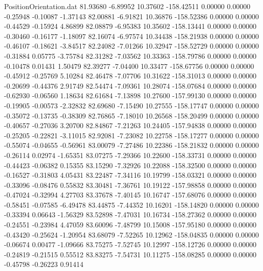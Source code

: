 \begin{filecontents}{PositionOrientation.dat}
  81.93680   -6.89952   10.37602  -158.42511    0.00000    0.00000   -0.25948   -0.10087   -1.37143
  82.00881   -6.91821   10.36876  -158.52386    0.00000    0.00000   -0.44529   -0.15924    4.86899
  82.08879   -6.95383   10.35602  -158.13441    0.00000    0.00000   -0.30460   -0.16177   -1.18097
  82.16074   -6.97574   10.34438  -158.21938    0.00000    0.00000   -0.46107   -0.18621   -3.84517
  82.24082   -7.01266   10.32947  -158.52729    0.00000    0.00000   -0.31884    0.05775   -3.75784
  82.31282   -7.03562   10.33363  -158.79786    0.00000    0.00000   -0.10478    0.01431    1.50479
  82.39277   -7.04400   10.33477  -158.67756    0.00000    0.00000   -0.45912   -0.25769    5.10284
  82.46478   -7.07706   10.31622  -158.31013    0.00000    0.00000   -0.20699   -0.44376    2.91749
  82.54474   -7.09361   10.28074  -158.07684    0.00000    0.00000   -0.62930   -0.06560    1.18634
  82.61684   -7.13898   10.27600  -157.99130    0.00000    0.00000   -0.19905   -0.00573   -2.32832
  82.69680   -7.15490   10.27555  -158.17747    0.00000    0.00000   -0.35072   -0.13735   -0.38309
  82.76865   -7.18010   10.26568  -158.20499    0.00000    0.00000   -0.40657   -0.27036    3.20700
  82.84867   -7.21263   10.24405  -157.94838    0.00000    0.00000   -0.25205   -0.22821   -3.11015
  82.92081   -7.23082   10.22758  -158.17277    0.00000    0.00000   -0.55074   -0.04655   -0.56961
  83.00079   -7.27486   10.22386  -158.21832    0.00000    0.00000   -0.26114    0.02974   -1.65351
  83.07275   -7.29366   10.22600  -158.33731    0.00000    0.00000   -0.44423   -0.06382    0.15355
  83.15290   -7.32926   10.22088  -158.32500    0.00000    0.00000   -0.16527   -0.31803    4.05431
  83.22487   -7.34116   10.19799  -158.03321    0.00000    0.00000   -0.33096   -0.08476    0.55832
  83.30481   -7.36761   10.19122  -157.98858    0.00000    0.00000   -0.47024   -0.32994    4.27703
  83.37678   -7.40145   10.16747  -157.68076    0.00000    0.00000   -0.58451   -0.07585   -6.49478
  83.44875   -7.44352   10.16201  -158.14820    0.00000    0.00000   -0.33394    0.06643   -1.56329
  83.52898   -7.47031   10.16734  -158.27362    0.00000    0.00000   -0.24551   -0.23984    4.47059
  83.60096   -7.48799   10.15008  -157.95180    0.00000    0.00000   -0.43420   -0.25624   -1.20954
  83.68079   -7.52265   10.12962  -158.04835    0.00000    0.00000   -0.06674    0.00477   -1.09666
  83.75275   -7.52745   10.12997  -158.12726    0.00000    0.00000   -0.24819   -0.21515    0.55512
  83.83275   -7.54731   10.11275  -158.08285    0.00000    0.00000   -0.45798   -0.26223    0.91414

\end{filecontents}
